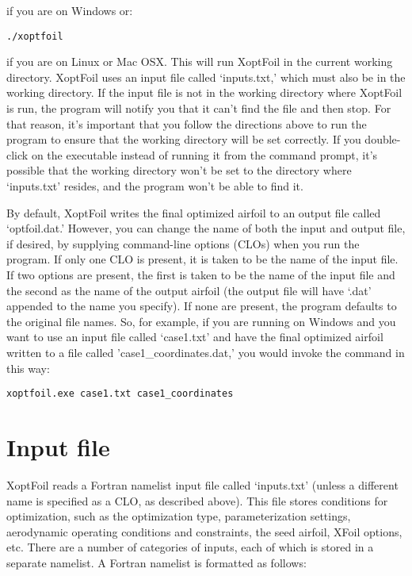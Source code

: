 \documentclass[11pt]{article}
\begin{document}
\noindent if you are on Windows or:

\begin{verbatim}
./xoptfoil
\end{verbatim}

\noindent if you are on Linux or Mac OSX.  This will run XoptFoil in the current working
directory.  XoptFoil uses an input file called `inputs.txt,' which must also be in the
working directory.  If the input file is not in the working directory where XoptFoil is
run, the program will notify you that it can't find the file and then stop.  For that
reason, it's important that you follow the directions above to run the program to ensure
that the working directory will be set correctly.  If you double-click on the executable
instead of running it from the command prompt, it's possible that the working directory
won't be set to the directory where `inputs.txt' resides, and the program won't be able to
find it.

By default, XoptFoil writes the final optimized airfoil to an output file called
`optfoil.dat.'  However, you can change the name of both the input and output file, if
desired, by supplying command-line options (CLOs) when you run the program.  If only one 
CLO is present, it is
taken to be the name of the input file.  If two options are present, the first is taken to
be the name of the input file and the second as
the name of the output airfoil (the output file will have `.dat' appended to the name you
specify). If none are present, the program defaults to the
original file names.  So, for example, if you are running on Windows and you want to
use an input file called `case1.txt' and have the final optimized airfoil written to a
file called 'case1\_coordinates.dat,' you would invoke the command in this way:

\begin{verbatim}
xoptfoil.exe case1.txt case1_coordinates
\end{verbatim}

\section{Input file}

XoptFoil reads a Fortran namelist input file called `inputs.txt' (unless a different name
is specified as a CLO, as described above).  This file stores
conditions for optimization, such as the optimization type, parameterization settings,
aerodynamic operating conditions and constraints, the seed airfoil, XFoil options, etc.
There are a number of categories of inputs, each of which is stored in a separate
namelist.  A Fortran namelist is formatted as follows:
\end{document}

